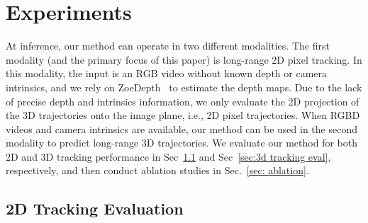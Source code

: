 \section{Experiments}\label{sec:exp}

At inference, our method can operate in two different modalities. The first modality (and the primary focus of this paper) is long-range 2D pixel tracking. In this modality, the input is an RGB video without known depth or camera intrinsics, and we rely on ZoeDepth~\cite{ZoeDepth} to estimate the depth maps. Due to the lack of precise depth and intrinsics information, we only evaluate the 2D projection of the 3D trajectories onto the image plane, i.e., 2D pixel trajectories. When RGBD videos and camera intrinsics are available, our method can be used in the second modality to predict long-range 3D trajectories.
We evaluate our method for both 2D and 3D tracking performance in Sec~\ref{sec:2d tracking eval} and Sec~\ref{sec:3d tracking eval}, respectively, and then conduct ablation studies in Sec.~\ref{sec: ablation}.







\subsection{2D Tracking Evaluation}
\label{sec:2d tracking eval}

